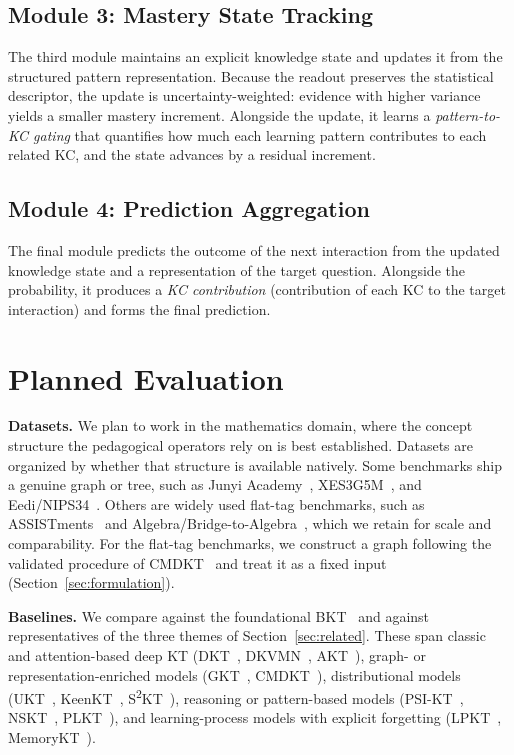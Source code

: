 \documentclass[conference]{IEEEtran}
\begin{document}
\subsection{Module 3: Mastery State Tracking}
\label{sec:mst}

The third module maintains an explicit knowledge state and updates it from the structured pattern representation. Because the readout preserves the statistical descriptor, the update is uncertainty-weighted: evidence with higher variance yields a smaller mastery increment. Alongside the update, it learns a \emph{pattern-to-KC gating} that quantifies how much each learning pattern contributes to each related KC, and the state advances by a residual increment.

\subsection{Module 4: Prediction Aggregation}
\label{sec:pred}

The final module predicts the outcome of the next interaction from the updated knowledge state and a representation of the target question. Alongside the probability, it produces a \emph{KC contribution} (contribution of each KC to the target interaction) and forms the final prediction.

\section{Planned Evaluation}
\label{sec:eval}

\textbf{Datasets.} We plan to work in the mathematics domain, where the concept structure the pedagogical operators rely on is best established. Datasets are organized by whether that structure is available natively. Some benchmarks ship a genuine graph or tree, such as Junyi Academy~\cite{chang2015junyi}, XES3G5M~\cite{liu2023xes3g5m}, and Eedi/NIPS34~\cite{wang2021neurips}. Others are widely used flat-tag benchmarks, such as ASSISTments~\cite{feng2009assistments} and Algebra/Bridge-to-Algebra~\cite{stamper2010kddcup}, which we retain for scale and comparability. For the flat-tag benchmarks, we construct a graph following the validated procedure of CMDKT~\cite{xia2025cmdkt} and treat it as a fixed input (Section~\ref{sec:formulation}).

\textbf{Baselines.} We compare against the foundational BKT~\cite{corbett1994kt} and against representatives of the three themes of Section~\ref{sec:related}. These span classic and attention-based deep KT (DKT~\cite{piech2015dkt}, DKVMN~\cite{zhang2017dkvmn}, AKT~\cite{ghosh2020akt}), graph- or representation-enriched models (GKT~\cite{nakagawa2019gkt}, CMDKT~\cite{xia2025cmdkt}), distributional models (UKT~\cite{chen2025ukt}, KeenKT~\cite{li2025keenkt}, S\textsuperscript{2}KT~\cite{wu2026sskt}), reasoning or pattern-based models (PSI-KT~\cite{zhou2024psikt}, NSKT~\cite{hooshyar2026nskt}, PLKT~\cite{wu2026plkt}), and learning-process models with explicit forgetting (LPKT~\cite{shen2021lpkt}, MemoryKT~\cite{lin2025memorykt}).
\end{document}
